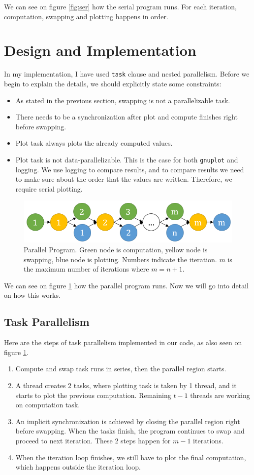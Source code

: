 \documentclass[11pt,reqno]{amsart}
\newcommand{\code}[1]{\texttt{#1}}
\begin{document}
We can see on figure \ref{fig:ser} how the serial program runs. For each iteration, computation, swapping and plotting happens in order.

\section{Design and Implementation}

In my implementation, I have used \code{task} clause and nested parallelism. Before we begin to explain the details, we should explicitly state some constraints:
\begin{itemize}
	\item As stated in the previous section, swapping is not a parallelizable task.
	\item There needs to be a synchronization after plot and compute finishes right before swapping.
	\item Plot task always plots the already computed values.
	\item Plot task is not data-parallelizable. This is the case for both \code{gnuplot} and logging. We use logging to compare results, and to compare results we need to make sure about the order that the values are written. Therefore, we require serial plotting.
\end{itemize}

\begin{figure}[h]
\centering
\label{fig:par}
\includegraphics[width=0.75\linewidth]{parallel_p1.png}
\caption{Parallel Program. Green node is computation, yellow node is swapping, blue node is plotting. Numbers indicate the iteration. $m$ is the maximum number of iterations where $m=n+1$.}
\end{figure}

We can see on figure \ref{fig:par} how the parallel program runs. Now we will go into detail on how this works.
\subsection{Task Parallelism}
Here are the steps of task parallelism implemented in our code, as also seen on figure \ref{fig:par}.
\begin{enumerate}
	\item Compute and swap task runs in series, then the parallel region starts.
	\item A thread creates 2 tasks, where plotting task is taken by 1 thread, and it starts to plot the previous computation. Remaining $t-1$ threads are working on computation task.
	\item An implicit synchronization is achieved by closing the parallel region right before swapping. When the tasks finish, the program continues to swap and proceed to next iteration. These 2 steps happen for $m-1$ iterations.
	\item When the iteration loop finishes, we still have to plot the final computation, which happens outside the iteration loop.
\end{enumerate}
\end{document}
